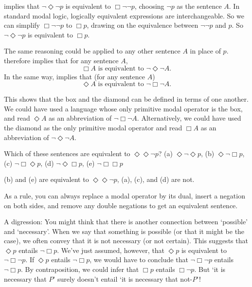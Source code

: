  implies that $\neg\Diamond\neg p$ is equivalent to $\Box\neg\neg p$,
choosing $\neg p$ as the sentence $A$. In standard modal logic, logically
equivalent expressions are interchangeable.\label{claim:replacement} So we can
simplify $\Box \neg\neg p$ to $\Box p$, drawing on the equivalence between
$\neg\neg p$ and $p$. So $\neg\Diamond\neg p$ is equivalent to
$\Box p$.


The same reasoning could be applied to any other sentence $A$ in place of
$p$.  therefore implies that for any sentence $A$,
\[
   \Box A\text{ is equivalent to }\neg\Diamond\neg A.
\]
In the same way,  implies that (for any sentence $A$)
\[
   \Diamond A\text{ is equivalent to }\neg\Box\neg A.
\]


This shows that the box and the diamond can be defined in terms of one another.
We could have used a language whose only primitive modal operator is the box,
and read $\Diamond A$ as an abbreviation of $\neg\Box\neg A$. Alternatively, we
could have used the diamond as the only primitive modal operator and read
$\Box A$ as an abbreviation of $\neg\Diamond\neg A$.

\begin{exercise}
  Which of these sentences are equivalent to $\Diamond\Diamond \neg p$?\newline
  (a) $\Diamond \neg \Diamond p$, (b) $\Diamond\neg \Box p$, (c)
  $\neg\Box\Diamond p$, (d) $\neg\Diamond\Box p$, (e) $\neg\Box\Box p$
\end{exercise}
\begin{solution}
  (b) and (e) are equivalent to $\Diamond\Diamond \neg p$, (a), (c), and (d) are
  not.
  
  As a rule, you can always replace a modal operator by its dual, insert a
  negation on both sides, and remove any double negations to get an equivalent
  sentence.
\end{solution}


A digression: You might think that there is another connection between `possible' and
`necessary'. When we say that something is possible (or that it might be the
case), we often convey that it is not necessary (or not certain). This suggests
that $\Diamond p$ entails $\neg \Box p$. We've just assumed, however, that
$\Diamond p$ is equivalent to $\neg \Box \neg p$. If $\Diamond p$ entails
$\neg \Box p$, we would have to conclude that $\neg\Box\neg p$ entails
$\neg\Box p$. By contraposition, we could infer that $\Box p$ entails
$\Box \neg p$. But `it is necessary that $P$' surely doesn't entail `it is
necessary that not-$P$'!

